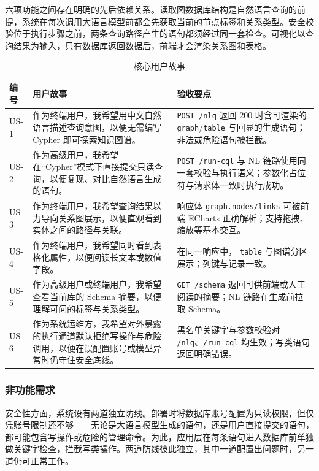 \documentclass[12pt,a4paper]{article}
\begin{document}
六项功能之间存在明确的先后依赖关系。读取图数据库结构是自然语言查询的前提，系统在每次调用大语言模型前都会先获取当前的节点标签和关系类型。安全校验位于执行步骤之前，两条查询路径产生的语句都须经过同一套检查。可视化以查询结果为输入，只有数据库返回数据后，前端才会渲染关系图和表格。

\begin{table}[H]
    \centering
    \caption{核心用户故事}
    \label{tab:user-stories}
    \small
    \begin{tabular}{p{1.1cm}p{4.6cm}p{5.8cm}}
        \toprule
        \textbf{编号} & \textbf{用户故事} & \textbf{验收要点} \\
        \midrule
        US-1 & 作为终端用户，我希望用中文自然语言描述查询意图，以便无需编写 Cypher 即可探索知识图谱。 & \texttt{POST /nlq} 返回 200 时含可渲染的 \texttt{graph}/\texttt{table} 与回显的生成语句；非法或危险语句被拦截。 \\
        US-2 & 作为高级用户，我希望在“Cypher”模式下直接提交只读查询，以便复现、对比自然语言生成的语句。 & \texttt{POST /run-cql} 与 NL 链路使用同一套校验与执行语义；参数化占位符与请求体一致时执行成功。 \\
        US-3 & 作为终端用户，我希望查询结果以力导向关系图展示，以便直观看到实体之间的路径与关联。 & 响应体 \texttt{graph.nodes/links} 可被前端 ECharts 正确解析；支持拖拽、缩放等基本交互。 \\
        US-4 & 作为终端用户，我希望同时看到表格化属性，以便阅读长文本或数值字段。 & 在同一响应中， \texttt{table} 与图谱分区展示；列键与记录一致。 \\
        US-5 & 作为高级用户或终端用户，我希望查看当前库的 Schema 摘要，以便理解可问的标签与关系类型。 & \texttt{GET /schema} 返回可供前端或人工阅读的摘要；NL 链路在生成前拉取 Schema。 \\
        US-6 & 作为系统运维方，我希望对外暴露的执行通道默认拒绝写操作与危险调用，以便在误配置账号或模型异常时仍守住安全底线。 & 黑名单关键字与参数校验对 \texttt{/nlq}、\texttt{/run-cql} 均生效；写类语句返回明确错误。 \\
        \bottomrule
    \end{tabular}
\end{table}

\subsubsection{非功能需求}

安全性方面，系统设有两道独立防线。部署时将数据库账号配置为只读权限，但仅凭账号限制还不够——无论是大语言模型生成的语句，还是用户直接提交的语句，都可能包含写操作或危险的管理命令。为此，应用层在每条语句进入数据库前单独做关键字检查，拦截写类操作。两道防线彼此独立，其中一道配置出问题时，另一道仍可正常工作。
\end{document}
